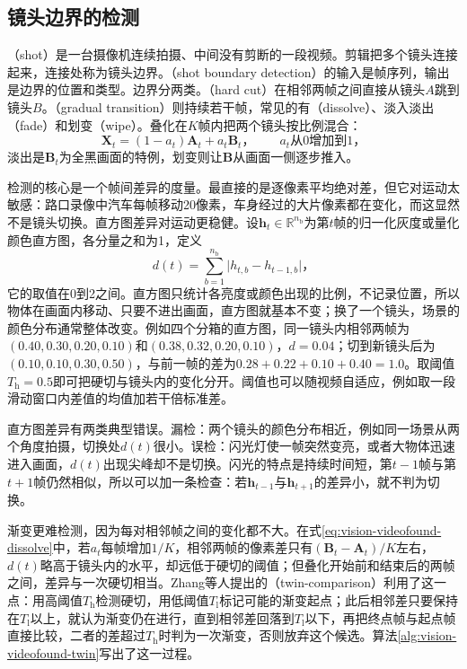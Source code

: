 \subsection{镜头边界的检测}
\label{sec:vision-videofound-shot-boundary}

（shot）是一台摄像机连续拍摄、中间没有剪断的一段视频。剪辑把多个镜头连接起来，连接处称为镜头边界。（shot boundary detection）的输入是帧序列，输出是边界的位置和类型。边界分两类。（hard cut）在相邻两帧之间直接从镜头$A$跳到镜头$B$。（gradual transition）则持续若干帧，常见的有（dissolve）、淡入淡出（fade）和划变（wipe）。叠化在$K$帧内把两个镜头按比例混合：
\begin{equation}
  \bm X_t=(1-a_t)\bm A_t+a_t\bm B_t\text{，}\qquad a_t\text{从0增加到1，}
  \label{eq:vision-videofound-dissolve}
\end{equation}
淡出是$\bm B_t$为全黑画面的特例，划变则让$\bm B$从画面一侧逐步推入。

检测的核心是一个帧间差异的度量。最直接的是逐像素平均绝对差，但它对运动太敏感：路口录像中汽车每帧移动20像素，车身经过的大片像素都在变化，而这显然不是镜头切换。直方图差异对运动更稳健。设$\bm h_t\in\mathbb{R}^{n_{\mathrm b}}$为第$t$帧的归一化灰度或量化颜色直方图，各分量之和为1，定义
\begin{equation}
  d(t)=\sum_{b=1}^{n_{\mathrm b}}\bigl|h_{t,b}-h_{t-1,b}\bigr|\text{，}
  \label{eq:vision-videofound-hist-diff}
\end{equation}
它的取值在0到2之间。直方图只统计各亮度或颜色出现的比例，不记录位置，所以物体在画面内移动、只要不进出画面，直方图就基本不变；换了一个镜头，场景的颜色分布通常整体改变。例如四个分箱的直方图，同一镜头内相邻两帧为$(0.40,0.30,0.20,0.10)$和$(0.38,0.32,0.20,0.10)$，$d=0.04$；切到新镜头后为$(0.10,0.10,0.30,0.50)$，与前一帧的差为$0.28+0.22+0.10+0.40=1.0$。取阈值$T_{\mathrm h}=0.5$即可把硬切与镜头内的变化分开。阈值也可以随视频自适应，例如取一段滑动窗口内差值的均值加若干倍标准差。

直方图差异有两类典型错误。漏检：两个镜头的颜色分布相近，例如同一场景从两个角度拍摄，切换处$d(t)$很小。误检：闪光灯使一帧突然变亮，或者大物体迅速进入画面，$d(t)$出现尖峰却不是切换。闪光的特点是持续时间短，第$t-1$帧与第$t+1$帧仍然相似，所以可以加一条检查：若$\bm h_{t-1}$与$\bm h_{t+1}$的差异小，就不判为切换。

渐变更难检测，因为每对相邻帧之间的变化都不大。在式\eqref{eq:vision-videofound-dissolve}中，若$a_t$每帧增加$1/K$，相邻两帧的像素差只有$(\bm B_t-\bm A_t)/K$左右，$d(t)$略高于镜头内的水平，却远低于硬切的阈值；但叠化开始前和结束后的两帧之间，差异与一次硬切相当。Zhang等人提出的（twin-comparison）利用了这一点：用高阈值$T_{\mathrm h}$检测硬切，用低阈值$T_{\mathrm l}$标记可能的渐变起点；此后相邻差只要保持在$T_{\mathrm l}$以上，就认为渐变仍在进行，直到相邻差回落到$T_{\mathrm l}$以下，再把终点帧与起点帧直接比较，二者的差超过$T_{\mathrm h}$时判为一次渐变，否则放弃这个候选。算法\ref{alg:vision-videofound-twin}写出了这一过程。


